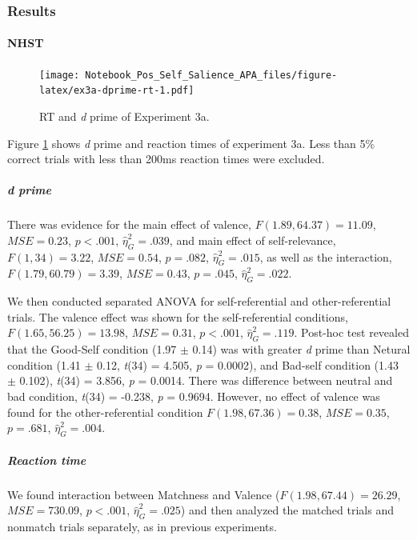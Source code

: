 \documentclass[
  english,
  man]{apa6}
\let\oldparagraph\paragraph
\renewcommand{\paragraph}[1]{\oldparagraph{#1}\mbox{}}
\let\oldsubparagraph\subparagraph
\renewcommand{\subparagraph}[1]{\oldsubparagraph{#1}\mbox{}}
\begin{document}
\hypertarget{results-5}{%
\subsubsection{Results}\label{results-5}}

\hypertarget{nhst-3}{%
\paragraph{NHST}\label{nhst-3}}

\begin{figure}
\centering
\texttt{[image: Notebook\_Pos\_Self\_Salience\_APA\_files/figure-latex/ex3a-dprime-rt-1.pdf]}
\caption{\label{fig:ex3a-dprime-rt}RT and \emph{d} prime of Experiment 3a.}
\end{figure}

Figure \ref{fig:ex3a-dprime-rt} shows \emph{d} prime and reaction times of experiment 3a. Less than 5\% correct trials with less than 200ms reaction times were excluded.

\hypertarget{d-prime-4}{%
\subparagraph{d prime}\label{d-prime-4}}

There was evidence for the main effect of valence, \(F(1.89, 64.37) = 11.09\), \(\mathit{MSE} = 0.23\), \(p < .001\), \(\hat{\eta}^2_G = .039\), and main effect of self-relevance, \(F(1, 34) = 3.22\), \(\mathit{MSE} = 0.54\), \(p = .082\), \(\hat{\eta}^2_G = .015\), as well as the interaction, \(F(1.79, 60.79) = 3.39\), \(\mathit{MSE} = 0.43\), \(p = .045\), \(\hat{\eta}^2_G = .022\).

We then conducted separated ANOVA for self-referential and other-referential trials. The valence effect was shown for the self-referential conditions, \(F(1.65, 56.25) = 13.98\), \(\mathit{MSE} = 0.31\), \(p < .001\), \(\hat{\eta}^2_G = .119\). Post-hoc test revealed that the Good-Self condition (1.97 \(\pm\) 0.14) was with greater \emph{d} prime than Netural condition (1.41 \(\pm\) 0.12, \emph{t}(34) = 4.505, \emph{p} = 0.0002), and Bad-self condition (1.43 \(\pm\) 0.102), \emph{t}(34) = 3.856, \emph{p} = 0.0014. There was difference between neutral and bad condition, \emph{t}(34) = -0.238, \emph{p} = 0.9694. However, no effect of valence was found for the other-referential condition \(F(1.98, 67.36) = 0.38\), \(\mathit{MSE} = 0.35\), \(p = .681\), \(\hat{\eta}^2_G = .004\).

\hypertarget{reaction-time-4}{%
\subparagraph{Reaction time}\label{reaction-time-4}}

We found interaction between Matchness and Valence (\(F(1.98, 67.44) = 26.29\), \(\mathit{MSE} = 730.09\), \(p < .001\), \(\hat{\eta}^2_G = .025\)) and then analyzed the matched trials and nonmatch trials separately, as in previous experiments.
\end{document}
